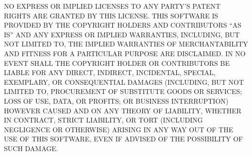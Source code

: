 NO EXPRESS OR IMPLIED LICENSES TO ANY PARTY'S PATENT RIGHTS ARE GRANTED
BY THIS LICENSE. THIS SOFTWARE IS PROVIDED BY THE COPYRIGHT HOLDERS AND
CONTRIBUTORS ``AS IS'' AND ANY EXPRESS OR IMPLIED WARRANTIES, INCLUDING,
BUT NOT LIMITED TO, THE IMPLIED WARRANTIES OF MERCHANTABILITY AND
FITNESS FOR A PARTICULAR PURPOSE ARE DISCLAIMED. IN NO EVENT SHALL THE
COPYRIGHT HOLDER OR CONTRIBUTORS BE LIABLE FOR ANY DIRECT, INDIRECT,
INCIDENTAL, SPECIAL, EXEMPLARY, OR CONSEQUENTIAL DAMAGES (INCLUDING, BUT
NOT LIMITED TO, PROCUREMENT OF SUBSTITUTE GOODS OR SERVICES; LOSS OF
USE, DATA, OR PROFITS; OR BUSINESS INTERRUPTION) HOWEVER CAUSED AND ON
ANY THEORY OF LIABILITY, WHETHER IN CONTRACT, STRICT LIABILITY, OR TORT
(INCLUDING NEGLIGENCE OR OTHERWISE) ARISING IN ANY WAY OUT OF THE USE OF
THIS SOFTWARE, EVEN IF ADVISED OF THE POSSIBILITY OF SUCH DAMAGE.

\endinput
